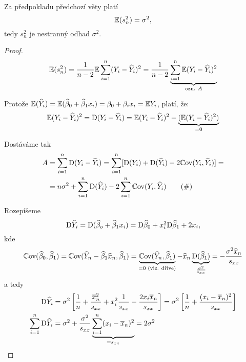 \begin{theorem}
	Za předpokladu předchozí věty platí
	$$
		\mathbb{E} (s_n^2) = \sigma^2,
	$$
	tedy $s_n^2$ je nestranný odhad $\sigma^2$.
\end{theorem}


\begin{proof}
	$$
		\mathbb{E}(s_n^2)  = \frac{1}{n-2} \mathbb{E} \sum_{i=1}^{n} (Y_i - \widehat{Y}_i)^2 = \frac{1}{n-2} \underbrace{\sum\limits_{i=1}^{n} \mathbb{E} (Y_i - \widehat{Y}_i)^2}_{\text{ozn. } A}
	$$
	
	Protože $\mathbb{E}(\widehat{Y}_i)  = \mathbb{E}(\widehat{\beta}_0 + \widehat{\beta}_1 x_i) = \beta_0 + \beta_i x_i = \mathbb{E} Y_i$, platí, že:
	$$
	\mathbb{E}(Y_i - \widehat{Y}_i)^2   = \mathrm{D}(Y_i - \widehat{Y}_i) = \mathbb{E} (Y_i - \widehat{Y}_i)^2 - \underbrace{(\mathbb{E}(Y_i - \widehat{Y}_i)^2)}_{= 0}
	$$
	
	Dostáváme tak	
	\begin{align*}
		A & = \sum_{i=1}^{n} \mathrm{D}(Y_i - \widehat{Y}_i) = \sum_{i=1}^n [ \mathrm{D}(Y_i) + \mathrm{D}(\widehat{Y}_i) - 2 \mathbb{C}\mathrm{ov}(Y_i, \widehat{Y}_i) ] =  \\
		& = n \sigma^2 + \sum_{i=1}^n \mathrm{D}(\widehat{Y}_i) - 2 \sum_{i=1}^n \mathbb{C}\mathrm{ov}(Y_i, \widehat{Y}_i) \tag{$\#$}
	\end{align*}
	
	Rozepíšeme
	$$
		\mathrm{D} \widehat{Y}_i  = \mathrm{D}(\widehat{\beta}_o + \widehat{\beta}_1 x_i) = \mathrm{D} \widehat{\beta}_0 + x_i^2 \mathrm{D} \widehat{\beta}_1 + 2 x_i,
	$$
	kde
	$$
		\mathbb{C}\mathrm{ov}(\widehat{\beta}_0, \widehat{\beta}_1) = \mathbb{C}\mathrm{ov}(\widehat{Y}_n - \widehat{\beta}_1 \widehat{x}_n, \widehat{\beta}_1) = \underbrace{\mathbb{C}\mathrm{ov}(\widehat{Y}_n, \widehat{\beta}_1)}_{= 0 \text{ (viz. dříve)}} - \widehat{x}_n \underbrace{\mathrm{D}(\widehat{\beta}_1)}_{\frac{\sigma^2}{s_{xx}}} = -\frac{\sigma^2 \widehat{x}_n}{s_{xx}}
	$$
	a tedy
	\begin{align*}
		\mathrm{D} \widehat{Y}_i & = \sigma^2 \left[ \frac{1}{n} + \frac{\overline{x}_n^2}{s_{xx}} + x_i^2 \frac{1}{s_{xx}} - \frac{2 x_i \overline{x}_n}{s_{xx}} \right] = \sigma^2 \left[ \frac{1}{n} + \frac{(x_i - \overline{x}_n)^2}{s_{xx}}\right] \\
		\sum_{i=1}^n \mathrm{D} \widehat{Y}_i & = \sigma^2 + \frac{\sigma^2}{s_{xx}} \underbrace{\sum_{i=1}^n (x_i - \overline{x}_n)^2}_{ = s_{xx}} = 2\sigma^2
	\end{align*}
	

\end{proof}
